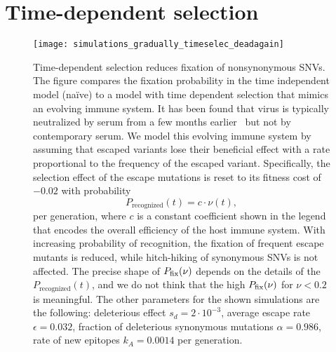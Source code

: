 
\section{Time-dependent selection}
\begin{figure}[h]
\begin{center}
\texttt{[image: simulations\_gradually\_timeselec\_deadagain]}
\caption{
Time-dependent selection reduces fixation of nonsynonymous SNVs. The figure
compares the fixation probability in the time independent model (na\"ive) to
a model with time dependent selection that mimics  an evolving immune system.
It has been found that virus is typically neutralized by serum from a few months
earlier~\citep{richman_rapid_2003} but not by contemporary serum. We model this
evolving immune system by assuming that escaped variants lose their beneficial
effect with a rate proportional to the frequency of the escaped variant. 
Specifically, the selection effect of the escape mutations is
reset to its fitness cost of $-0.02$ with probability
\[ P_\text{recognized}(t) = c \cdot \nu(t), \] 
per generation, where $c$ is a constant coefficient shown in the legend that
encodes the overall efficiency of the host immune system. With increasing
probability of recognition, the fixation of frequent escape mutants is reduced,
while hitch-hiking of synonymous SNVs is not affected. The precise
shape of $P_{\mathrm{fix}}(\nu)$ depends on the details of the $P_\text{recognized}(t)$, and 
we do not think that the high $P_{\mathrm{fix}}(\nu)$ for $\nu<0.2$ is meaningful.
The other parameters for the shown simulations are
the following: deleterious effect $s_d = 2 \cdot 10^{-3}$, average escape rate $\epsilon
= 0.032$, fraction of deleterious synonymous mutations $\alpha = 0.986$, rate of new epitopes
$k_A=0.0014$ per generation.
}
\label{fig:tds}
\end{center}
\end{figure}

